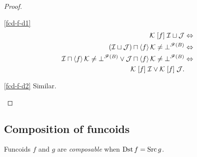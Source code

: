 \begin{proof}
~
\begin{disorder}
\item [{\ref{fcd-f-d1}}] ~
\begin{align*}
\mathcal{K}\mathrel{\left[f\right]}\mathcal{I}\sqcup\mathcal{J} & \Leftrightarrow\\
(\mathcal{I}\sqcup\mathcal{J})\sqcap\left\langle f\right\rangle\mathcal{K}\ne\bot^{\mathscr{F}(B)}
& \Leftrightarrow\\
\mathcal{I}\sqcap\left\langle f\right\rangle\mathcal{K}\ne\bot^{\mathscr{F}(B)}\lor\mathcal{J}\sqcap\left\langle f\right\rangle\mathcal{K}\ne\bot^{\mathscr{F}(B)} & \Leftrightarrow\\
\mathcal{K}\mathrel{\left[f\right]}\mathcal{I}\lor\mathcal{K}\mathrel{\left[f\right]}\mathcal{J}.
\end{align*}

\item [{\ref{fcd-f-d2}}] Similar.
\end{disorder}
\end{proof}

\subsection{Composition of funcoids}
\begin{defn}
Funcoids $f$
and $g$ are \emph{composable} when $\operatorname{Dst} f=\operatorname{Src} g$.
\end{defn}

